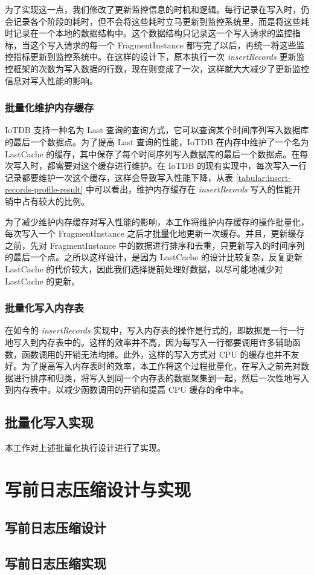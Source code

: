  为了实现这一点，我们修改了更新监控信息的时机和逻辑。每行记录在写入时，仍会记录各个阶段的耗时，但不会将这些耗时立马更新到监控系统里，而是将这些耗时记录在一个本地的数据结构中。这个数据结构只记录这一个写入请求的监控指标，当这个写入请求的每一个 FragmentInstance 都写完了以后，再统一将这些监控指标更新到监控系统中。在这样的设计下，原本执行一次 \emph{insertRecords} 更新监控框架的次数为写入数据的行数，现在则变成了一次，这样就大大减少了更新监控信息对写入性能的影响。

\subsubsection{批量化维护内存缓存}
IoTDB 支持一种名为 Last 查询的查询方式，它可以查询某个时间序列写入数据库的最后一个数据点。为了提高 Last 查询的性能，IoTDB 在内存中维护了一个名为 LastCache 的缓存，其中保存了每个时间序列写入数据库的最后一个数据点。在每次写入时，都需要对这个缓存进行维护。在 IoTDB 的现有实现中，每次写入一行记录都要维护一次这个缓存，这样会导致写入性能下降，从表 \ref{tabular:insert-records-profile-result} 中可以看出，维护内存缓存在 \emph{insertRecords} 写入的性能开销中占有较大的比例。

为了减少维护内存缓存对写入性能的影响，本工作将维护内存缓存的操作批量化，每次写入一个 FragmentInstance 之后才批量化地更新一次缓存。并且，更新缓存之前，先对 FragmentInstance 中的数据进行排序和去重，只更新写入的时间序列的最后一个点。之所以这样设计，是因为 LastCache 的设计比较复杂，反复更新 LastCache 的代价较大，因此我们选择提前处理好数据，以尽可能地减少对 LastCache 的更新。
\subsubsection{批量化写入内存表}
在如今的 \emph{insertRecords} 实现中，写入内存表的操作是行式的，即数据是一行一行地写入到内存表中的。这样的效率并不高，因为每写入一行都要调用许多辅助函数，函数调用的开销无法均摊。此外，这样的写入方式对 CPU 的缓存也并不友好\cite{boncz2005monetdb}。为了提高写入内存表时的效率，本工作将这个过程批量化，在写入之前先对数据进行排序和归类，将写入到同一个内存表的数据聚集到一起，然后一次性地写入到内存表中，以减少函数调用的开销和提高 CPU 缓存的命中率。

\subsection{批量化写入实现}
本工作对上述批量化执行设计进行了实现。

\section{写前日志压缩设计与实现}
\subsection{写前日志压缩设计}
\subsection{写前日志压缩实现}